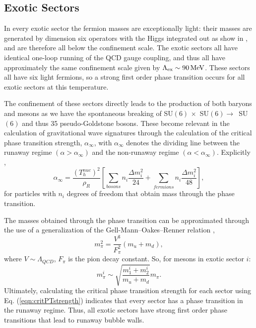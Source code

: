 \documentclass[nofootinbib,twocolumn,preprintnumbers]{revtex4-1}
\begin{document}
\subsection{Exotic Sectors}

In every exotic sector the fermion masses are exceptionally light: their masses are generated by dimension six operators with the Higgs integrated out as show in , and are therefore all below the confinement scale. The exotic sectors all have identical one-loop running of the QCD gauge coupling, and thus all have approximately the same confinement scale given by $\Lambda_{\rm ex} \sim 90 \,\mathrm{MeV}$. These sectors all have six light fermions, so a strong first order phase transition occurs for all exotic sectors at this temperature. 

The confinement of these sectors directly leads to the production of both baryons and mesons as we have the spontaneous breaking of SU$(6) \,\times$ SU$(6) \rightarrow\,$ SU$(6)$ and thus 35 pseudo-Goldstone bosons. These become relevant in the calculation of gravitational wave signatures through the calculation of the critical phase transition strength, $\alpha_{\infty}$, with $\alpha_{\infty}$ denotes the dividing line between the runaway regime  $(\alpha >\alpha_{\infty})$ and the non-runaway regime $(\alpha <\alpha_{\infty})$. Explicitly \cite{Breitbach:2018ddu, Caprini:2015zlo, Espinosa:2010hh}, 
\begin{equation}\label{eqn:critPTstrength}
\alpha_{\infty} = \frac{(T^{nuc}_h)^2}{\rho_R}\left[\sum_{bosons} n_i\frac{\Delta m^2_i}{24} + \sum_{fermions} n_i\frac{\Delta m_i^2}{48}\right],
\end{equation} 
for particles with $n_i$ degrees of freedom that obtain mass through the phase transition. 

The masses obtained through the phase transition can be approximated through the use of a generalization of the Gell-Mann--Oakes--Renner relation  \cite{Schwartz:2013pla},
\begin{equation}\label{eqn:gmor}
m^2_{\pi} = \frac{V^3}{F^2_{\pi}}(m_u + m_d),
\end{equation}
where $V \sim \Lambda_{QCD}$, $F_\pi$ is the pion decay constant. So, for mesons in exotic sector $i$:
\begin{equation}
m_{\pi}^i \sim \sqrt{\frac{m_1^i+m_2^i}{m_u + m_d}} m_{\pi}.
\end{equation}
 Ultimately, calculating the critical phase transition strength for each sector using Eq. (\ref{eqn:critPTstrength}) indicates that every sector has a phase transition in the runaway regime. Thus, all exotic sectors have strong first order phase transitions that lead to runaway bubble walls.
\end{document}
